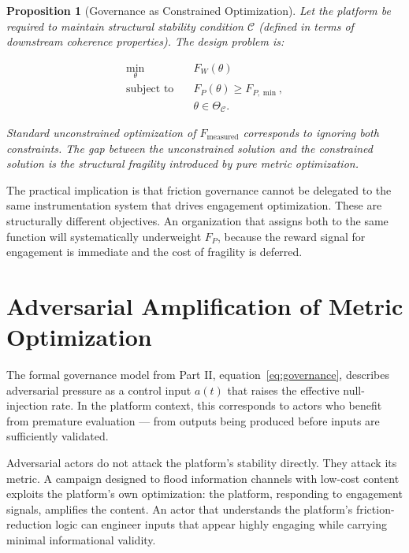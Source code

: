 \documentclass[11pt]{article}
\newtheorem{proposition}{Proposition}
\theoremstyle{remark}
\begin{document}
\begin{proposition}[Governance as Constrained Optimization]
\label{prop:governance_constrained}
Let the platform be required to maintain structural stability condition $\mathcal{C}$ (defined in terms of downstream coherence properties). The design problem is:

\begin{align}
\min_\theta \quad & F_W(\theta) \\
\text{subject to} \quad & F_P(\theta) \geq F_{P,\min}, \\
& \theta \in \Theta_{\mathcal{C}}.
\end{align}

Standard unconstrained optimization of $F_{\text{measured}}$ corresponds to ignoring both constraints. The gap between the unconstrained solution and the constrained solution is the structural fragility introduced by pure metric optimization.
\end{proposition}

The practical implication is that friction governance cannot be delegated to the same instrumentation system that drives engagement optimization. These are structurally different objectives. An organization that assigns both to the same function will systematically underweight $F_P$, because the reward signal for engagement is immediate and the cost of fragility is deferred.

\section{Adversarial Amplification of Metric Optimization}
\label{sec:adversarial_amplification}

The formal governance model from Part II, equation~\eqref{eq:governance}, describes adversarial pressure as a control input $a(t)$ that raises the effective null-injection rate. In the platform context, this corresponds to actors who benefit from premature evaluation --- from outputs being produced before inputs are sufficiently validated.

Adversarial actors do not attack the platform's stability directly. They attack its metric. A campaign designed to flood information channels with low-cost content exploits the platform's own optimization: the platform, responding to engagement signals, amplifies the content. An actor that understands the platform's friction-reduction logic can engineer inputs that appear highly engaging while carrying minimal informational validity.
\end{document}
